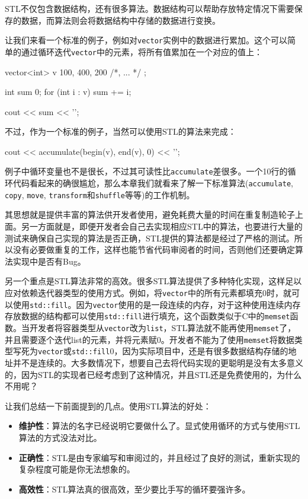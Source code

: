 STL不仅包含数据结构，还有很多算法。数据结构可以帮助存放特定情况下需要保存的数据，而算法则会将数据结构中存储的数据进行变换。

让我们来看一个标准的例子，例如对\texttt{vector}实例中的数据进行累加。这个可以简单的通过循环迭代\texttt{vector}中的元素，将所有值累加在一个对应的值上：

\begin{codebox}[cpp]
vector<int> v {100, 400, 200 /*, ... */ };

int sum {0};
for (int i : v) { sum += i; }

cout << sum << '\n';
\end{codebox}

不过，作为一个标准的例子，当然可以使用STL的算法来完成：

\begin{codebox}[cpp]
cout << accumulate(begin(v), end(v), 0) << '\n';
\end{codebox}

例子中循环变量也不是很长，不过其可读性比\texttt{accumulate}差很多。一个10行的循环代码看起来的确很尴尬，那么本章我们就看来了解一下标准算法(\texttt{accumulate}, \texttt{copy}, \texttt{move}, \texttt{transform}和\texttt{shuffle}等等)的工作机制。

其思想就是提供丰富的算法供开发者使用，避免耗费大量的时间在重复制造轮子上面。另一方面就是，即便开发者会自己去实现相应STL中的算法，也要进行大量的测试来确保自己实现的算法是否正确，STL提供的算法都是经过了严格的测试。所以没有必要做重复的工作，这样也能节省代码审阅者的时间，否则他们还要确定算法实现中是否有Bug。

另一个重点是STL算法非常的高效。很多STL算法提供了多种特化实现，这样足以应对依赖迭代器类型的使用方式。例如，将\texttt{vector}中的所有元素都填充0时，就可以使用\texttt{std::fill}。因为\texttt{vector}使用的是一段连续的内存，对于这种使用连续内存存放数据的结构都可以使用\texttt{std::fill}进行填充，这个函数类似于C中的\texttt{memset}函数。当开发者将容器类型从\texttt{vector}改为\texttt{list}，STL算法就不能再使用\texttt{memset}了，并且需要逐个迭代list的元素，并将元素赋0。开发者不能为了使用\texttt{memset}将数据类型写死为\texttt{vector}或\texttt{std::fill}0，因为实际项目中，还是有很多数据结构存储的地址并不是连续的。大多数情况下，想要自己去将代码实现的更聪明是没有太多意义的，因为STL的实现者已经考虑到了这种情况，并且STL还是免费使用的，为什么不用呢？

让我们总结一下前面提到的几点。使用STL算法的好处：

\begin{itemize}
\item \textbf{维护性}：算法的名字已经说明它要做什么了。显式使用循环的方式与使用STL算法的方式没法对比。

\item \textbf{正确性}：STL是由专家编写和审阅过的，并且经过了良好的测试，重新实现的复杂程度可能是你无法想象的。

\item \textbf{高效性}：STL算法真的很高效，至少要比手写的循环要强许多。

\end{itemize}

